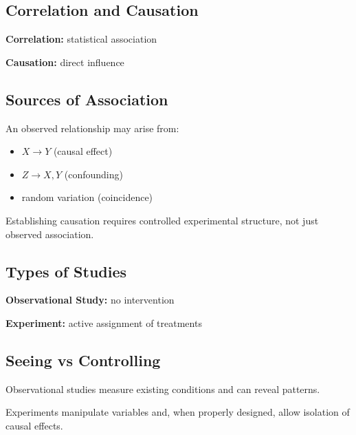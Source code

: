 \documentclass[11pt]{article}
\begin{document}
\begin{tcolorbox}[mybox]
\section*{Correlation and Causation}

\textbf{Correlation:} statistical association  

\textbf{Causation:} direct influence  

\subsection*{Sources of Association}

An observed relationship may arise from:
\begin{itemize}
\item $X \rightarrow Y$ (causal effect)
\item $Z \rightarrow X, Y$ (confounding)
\item random variation (coincidence)
\end{itemize}

Establishing causation requires controlled experimental structure, not just observed association.
\end{tcolorbox}


\begin{tcolorbox}[mybox]
\section*{Types of Studies}

\textbf{Observational Study:} no intervention  

\textbf{Experiment:} active assignment of treatments  

\subsection*{Seeing vs Controlling}

Observational studies measure existing conditions and can reveal patterns.

Experiments manipulate variables and, when properly designed, allow isolation of causal effects.
\end{tcolorbox}
\end{document}
